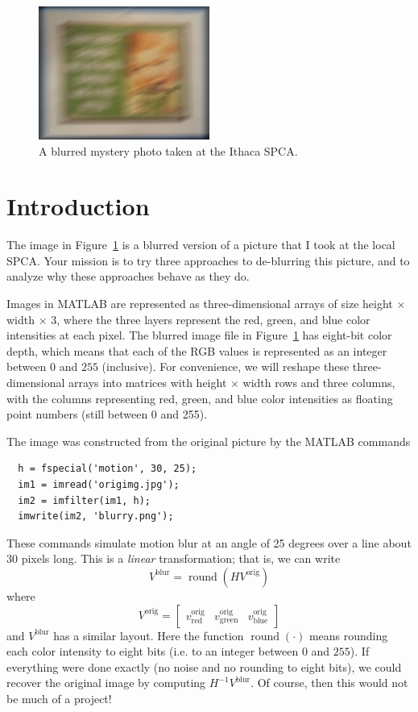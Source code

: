 \documentclass[12pt, leqno]{article} %
\begin{document}

\begin{figure}
\begin{center}
\includegraphics[width=0.5\textwidth]{proj2code/blurry.png}
\end{center}
\caption{A blurred mystery photo taken at the Ithaca SPCA.}
\label{fig1}
\end{figure}

\section{Introduction}

The image in Figure~\ref{fig1} is a blurred version of a picture that
I took at the local SPCA.  Your mission is to try three approaches to
de-blurring this picture, and to analyze why these approaches behave
as they do.

Images in MATLAB are represented as three-dimensional arrays of size
height $\times$ width $\times$ 3, where the three layers represent the
red, green, and blue color intensities at each pixel.  The blurred
image file in Figure~\ref{fig1} has eight-bit color depth, which means
that each of the RGB values is represented as an integer between $0$
and $255$ (inclusive).  For convenience, we will reshape these
three-dimensional arrays into matrices with height $\times$ width rows
and three columns, with the columns representing red, green, and blue
color intensities as floating point numbers (still between 0 and 255).

The image was constructed from the original picture by the MATLAB
commands
\begin{lstlisting}
  h = fspecial('motion', 30, 25);
  im1 = imread('origimg.jpg');
  im2 = imfilter(im1, h);
  imwrite(im2, 'blurry.png');
\end{lstlisting}
These commands simulate motion blur at an angle of 25 degrees over a
line about 30 pixels long.  This is a {\em linear} transformation;
that is, we can write
\[
  V^{\mathrm{blur}} = \operatorname{round}(H V^{\mathrm{orig}})
\]
where 
\[
  V^{\mathrm{orig}} = 
  \begin{bmatrix} 
    v^{\mathrm{orig}}_{\mathrm{red}} &
    v^{\mathrm{orig}}_{\mathrm{green}} &
    v^{\mathrm{orig}}_{\mathrm{blue}}
  \end{bmatrix}
\]
and $V^{\mathrm{blur}}$ has a similar layout.  Here the function
$\operatorname{round}(\cdot)$ means rounding each color intensity to
eight bits (i.e. to an integer between $0$ and $255$).  If everything
were done exactly (no noise and no rounding to eight bits), we could
recover the original image by computing $H^{-1} V^{\mathrm{blur}}$.
Of course, then this would not be much of a project!
\end{document}
